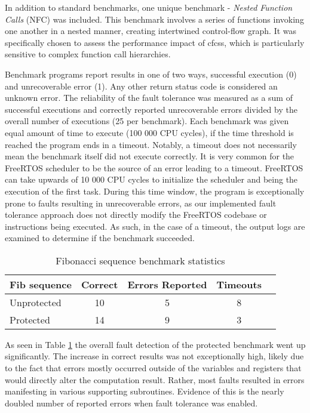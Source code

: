 In addition to standard benchmarks, one unique benchmark - \textit{Nested Function Calls} (NFC) was included. This benchmark involves a series of functions invoking one another in a nested manner, creating intertwined control-flow graph. It was specifically chosen to assess the performance impact of \acrshort{cfcss}, which is particularly sensitive to complex function call hierarchies.

Benchmark programs report results in one of two ways, successful execution (0) and unrecoverable error (1). Any other return status code is considered an unknown error. The reliability of the fault tolerance was measured as a sum of successful executions and correctly reported unrecoverable errors divided by the overall number of executions (25 per benchmark). Each benchmark was given equal amount of time to execute (100 000 CPU cycles), if the time threshold is reached the program ends in a timeout. Notably, a timeout does not necessarily mean the benchmark itself did not execute correctly. It is very common for the FreeRTOS scheduler to be the source of an error leading to a timeout. FreeRTOS can take upwards of 10 000 CPU cycles to initialize the scheduler and being the execution of the first task. During this time window, the program is exceptionally prone to faults resulting in unrecoverable errors, as our implemented fault tolerance approach does not directly modify the FreeRTOS codebase or instructions being executed. As such, in the case of a timeout, the output logs are examined to determine if the benchmark succeeded.

\begin{table}[h]
\centering
\begin{tabular}{|l|c|c|c|c|}
\hline
\textbf{Fib sequence} & \textbf{Correct} & \textbf{Errors Reported} & \textbf{Timeouts} \\
\hline
Unprotected & 10 & 5 & 8 \\
Protected & 14 & 9 & 3 \\
\hline
\end{tabular}
\caption{Fibonacci sequence benchmark statistics}
\label{tab:fib_bench}
\end{table}

As seen in Table \ref{tab:fib_bench} the overall fault detection of the protected benchmark went up significantly. The increase in correct results was not exceptionally high, likely due to the fact that errors mostly occurred outside of the variables and registers that would directly alter the computation result. Rather, most faults resulted in errors manifesting in various supporting subroutines. Evidence of this is the nearly doubled number of reported errors when fault tolerance was enabled.


